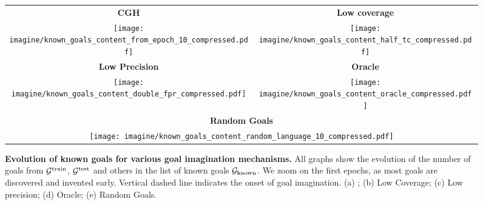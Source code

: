 \begin{figure}[!h]
\centering
\begin{tabular}{cc}

\textbf{CGH} & \textbf{Low coverage}\\
\texttt{[image: imagine/known\_goals\_content\_from\_epoch\_10\_compressed.pdf]} & \texttt{[image: imagine/known\_goals\_content\_half\_tc\_compressed.pdf]} \\
\textbf{Low Precision} & \textbf{Oracle}\\
\texttt{[image: imagine/known\_goals\_content\_double\_fpr\_compressed.pdf]} & \texttt{[image: imagine/known\_goals\_content\_oracle\_compressed.pdf]} \\
\multicolumn{2}{c}{\textbf{Random Goals}}\\
\multicolumn{2}{c}{\texttt{[image: imagine/known\_goals\_content\_random\_language\_10\_compressed.pdf]}}

	
\end{tabular}

%
      \caption{\textbf{Evolution of known goals for various goal imagination mechanisms.} All graphs show the evolution of the number of goals from $\mathcal{G}^{\text{train}}$, $\mathcal{G}^{\text{test}}$ and others in the list of known goals $\mathcal{G}_\text{known}$. We zoom on the first epochs, as most goals are discovered and invented early. Vertical dashed line indicates the onset of goal imagination. (a) \CGH; (b) Low Coverage; (c) Low precision; (d) Oracle; (e) Random Goals. \label{fig:suppl_known_goals}}
\end{figure} 

\newpage
